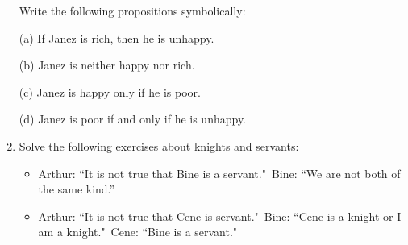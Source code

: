 \documentclass[11pt,paper=b5,footinclude,headinclude]{scrbook} %
\begin{document}
\begin{enumerate}
Write the following propositions symbolically:

(a) If Janez is rich, then he is unhappy.

(b) Janez is neither happy nor rich.

(c) Janez is happy only if he is poor.

(d) Janez is poor if and only if he is unhappy.

\item Solve the following exercises about knights and servants:
\begin{itemize}
  \item Arthur: ``It is not true that Bine is a servant."~Bine: ``We are not both of the same kind.''
  \item Arthur: ``It is not true that Cene is servant."~Bine: ``Cene is a knight or I am a knight."~Cene: ``Bine is a servant."
\end{itemize}


\end{enumerate}
\end{document}
